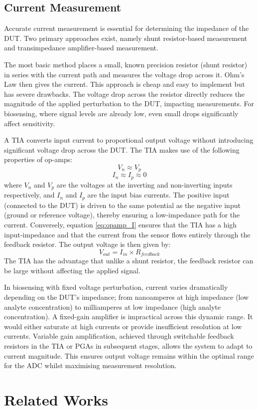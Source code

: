 \subsection{Current Measurement}
Accurate current measurement is essential for determining the impedance of the \ac{DUT}. Two primary approaches exist, namely shunt resistor-based measurement and transimpedance amplifier-based measurement.

The most basic method places a small, known precision resistor (shunt resistor) in series with the current path and measures the voltage drop across it. Ohm's Law then gives the current. This approach is cheap and easy to implement but has severe drawbacks. The voltage drop across the resistor directly reduces the magnitude of the applied perturbation to the \ac{DUT}, impacting measurements. For biosensing, where signal levels are already low, even small drops significantly affect sensitivity.

A \ac{TIA} converts input current to proportional output voltage without introducing significant voltage drop across the \ac{DUT}. The \ac{TIA} makes use of the following properties of op-amps:
\begin{equation}
    V_n \approx V_p
    \label{eq:opamp_V}
\end{equation}
\begin{equation}
    I_n \approx I_p \approx 0
    \label{eq:opamp_I}
\end{equation}
where $V_n$ and $V_p$ are the voltages at the inverting and non-inverting inputs respectively, and $I_n$ and $I_p$ are the input bias currents. The positive input (connected to the \ac{DUT}) is driven to the same potential as the negative input (ground or reference voltage), thereby ensuring a low-impedance path for the current. Conversely, equation \ref{eq:opamp_I} ensures that the TIA has a high input-impedance and that the current from the sensor flows entirely through the feedback resistor. The output voltage is then given by:
\begin{equation}
    V_{out}=I_{in} \times R_{feedback}
    \label{eq:tia_gain}
\end{equation}
The \ac{TIA} has the advantage that unlike a shunt resistor, the feedback resistor can be large without affecting the applied signal.

In biosensing with fixed voltage perturbation, current varies dramatically depending on the \ac{DUT}'s impedance; from nanoamperes at high impedance (low analyte concentration) to milliamperes at low impedance (high analyte concentration). A fixed-gain amplifier is impractical across this dynamic range. It would either saturate at high currents or provide insufficient resolution at low currents. Variable gain amplification, achieved through switchable feedback resistors in the \ac{TIA} or \acp{PGA} in subsequent stages, allows the system to adapt to current magnitude. This ensures output voltage remains within the optimal range for the \ac{ADC} whilst maximising measurement resolution.

\section{Related Works}

\label{chap:literature_review}